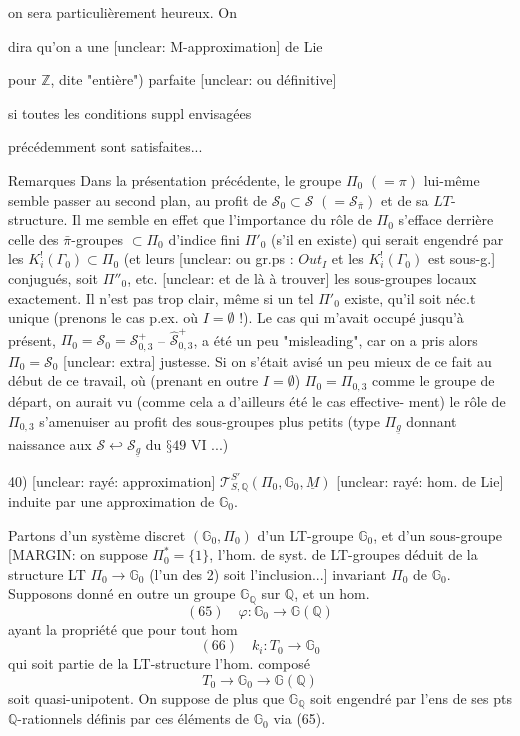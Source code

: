 on sera particulièrement heureux. On

dira qu'on a une [unclear: M-approximation] de Lie

pour $\mathbb{Z}$, dite "entière") parfaite [unclear: ou définitive]

si toutes les conditions suppl envisagées

précédemment sont satisfaites...

\newpage


Remarques Dans la présentation précédente, le
groupe $\Pi_0$ $(=\pi)$ lui-même semble passer au second
plan, au profit de $\mathcal{S}_0 \subset \mathcal{S}$ $(= \mathcal{S}_{\bar{\pi}})$ et de sa $LT$-structure.
Il me semble en effet que l'importance du
rôle de $\Pi_0$ s'efface derrière celle des $\bar{\pi}$-groupes
$\subset \Pi_0$ d'indice fini $\Pi'_0$ (s'il en existe) qui serait
engendré par les $K_i^!(\Gamma_0) \subset \Pi_0$ (et leurs
[unclear: ou gr.ps : $Out_I$ et les $K_i^!(\Gamma_0)$ est sous-g.]
conjugués, soit $\Pi''_0$, etc. [unclear: et de là à trouver]
les sous-groupes locaux exactement. Il
n'est pas trop clair, même si un tel $\Pi'_0$ existe,
qu'il soit néc.t unique (prenons le cas
p.ex. où $I = \emptyset$ !). Le cas qui m'avait
occupé jusqu'à présent, $\Pi_0 = \mathcal{S}_0 = \mathcal{S}^+_{0,3}$ --
$\widehat{\mathcal{S}}_{0,3}^+$, a été un peu "misleading", car
on a pris alors $\Pi_0 = \mathcal{S}_0$ [unclear: extra] justesse. Si on
s'était avisé un peu mieux de ce fait au
début de ce travail, où (prenant en outre $I=\emptyset$) $\Pi_0 = \Pi_{0,3}$ comme
le groupe de départ, on aurait vu
(comme cela a d'ailleurs été le cas effective-
ment) le rôle de $\Pi_{0,3}$ s'amenuiser au
profit des sous-groupes plus petits (type $\Pi_{\underline{g}}$
donnant naissance aux $\mathcal{S} \hookleftarrow \mathcal{S}_{\underline{g}}$ du $§ 49$ VI ...)

\newpage


40) [unclear: rayé: approximation] $\mathcal{T}_{S,\mathbb{Q}}^{S'}(\Pi_0,\mathbb{G}_0,\underline{M})$ [unclear: rayé: hom. de Lie] induite par une approximation de $\mathbb{G}_0$.

Partons d'un système discret $(\mathbb{G}_0, \Pi_0)$ d'un LT-groupe $\mathbb{G}_0$, et d'un sous-groupe [MARGIN: on suppose $\Pi_0^*=\{1\}$, l'hom. de syst. de LT-groupes déduit de la structure LT $\Pi_0 \to \mathbb{G}_0$ (l'un des 2) soit l'inclusion...] invariant $\Pi_0$ de $\mathbb{G}_0$. Supposons donné en outre un groupe $\mathbb{G}_{\mathbb{Q}}$ sur $\mathbb{Q}$, et un hom. 
$$ (65) \quad \varphi : \mathbb{G}_0 \to \mathbb{G}(\mathbb{Q}) $$
ayant la propriété que pour tout hom
$$ (66) \quad k_i : T_0 \to \mathbb{G}_0 $$
qui soit partie de la LT-structure l'hom. composé
$$ T_0 \to \mathbb{G}_0 \to \mathbb{G}(\mathbb{Q}) $$
soit quasi-unipotent. On suppose de plus que $\mathbb{G}_{\mathbb{Q}}$ soit engendré par l'ens de ses pts $\mathbb{Q}$-rationnels définis par ces éléments de $\mathbb{G}_0$ via (65).

